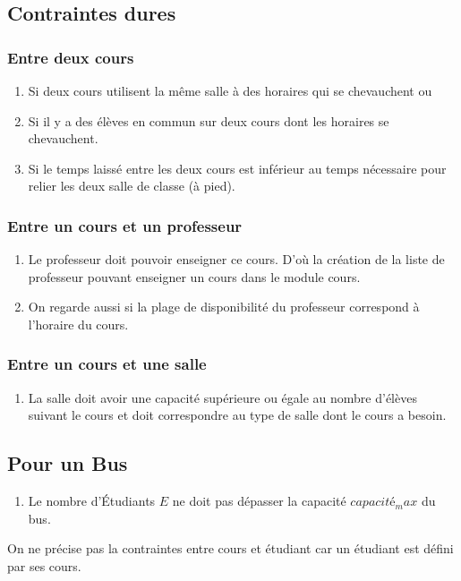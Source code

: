 \documentclass[a4paper,11pt]{article}
\begin{document}
	\subsection{Contraintes dures}
			\subsubsection{Entre deux cours}
				\begin{enumerate}
					\item Si deux cours utilisent la même salle à des horaires qui se chevauchent ou
					\item Si il y a des élèves en commun sur deux cours dont les horaires se chevauchent.
					\item Si le temps laissé entre les deux cours est inférieur au temps nécessaire pour relier les deux salle de classe (à pied).
				\end{enumerate}
			\subsubsection{Entre un cours et un professeur}
				\begin{enumerate}
					\item Le professeur doit pouvoir enseigner ce cours. D'où la création de la liste de professeur pouvant enseigner un cours dans le module cours.
					\item 	On regarde aussi si la plage de disponibilité du professeur correspond à l'horaire du cours.
				\end{enumerate}
			\subsubsection{Entre un cours et une salle}
				\begin{enumerate}
					\item 	La salle doit avoir une capacité supérieure ou égale au nombre d'élèves suivant le cours et doit correspondre au type de salle dont le cours a besoin.
				\end{enumerate}
			\subsection{Pour un Bus}
				\begin{enumerate}
					\item Le nombre d'Étudiants $E$ ne doit pas dépasser la capacité $capacité_max$ du bus.
				\end{enumerate}
	On ne précise pas la contraintes entre cours et étudiant car un étudiant est défini par ses cours.
\end{document}
